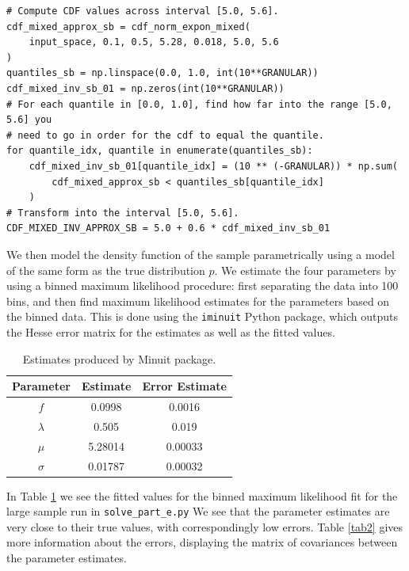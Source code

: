 \documentclass[12pt]{article}
\begin{document}
\begin{lstlisting}[caption=Code block producing array of values for inverse CDF of $p$ (e).]
# Compute CDF values across interval [5.0, 5.6].
cdf_mixed_approx_sb = cdf_norm_expon_mixed(
    input_space, 0.1, 0.5, 5.28, 0.018, 5.0, 5.6
)
quantiles_sb = np.linspace(0.0, 1.0, int(10**GRANULAR))
cdf_mixed_inv_sb_01 = np.zeros(int(10**GRANULAR))
# For each quantile in [0.0, 1.0], find how far into the range [5.0, 5.6] you
# need to go in order for the cdf to equal the quantile.
for quantile_idx, quantile in enumerate(quantiles_sb):
    cdf_mixed_inv_sb_01[quantile_idx] = (10 ** (-GRANULAR)) * np.sum(
        cdf_mixed_approx_sb < quantiles_sb[quantile_idx]
    )
# Transform into the interval [5.0, 5.6].
CDF_MIXED_INV_APPROX_SB = 5.0 + 0.6 * cdf_mixed_inv_sb_01
\end{lstlisting}

We then model the density function of the sample parametrically using a model of the same form as the true distribution $p$.
We estimate the four parameters by using a binned maximum likelihood procedure: first separating the data into 100 bins, and then find maximum likelihood estimates for the parameters based on the binned data.
This is done using the \texttt{iminuit} Python package, which outputs the Hesse error matrix for the estimates as well as the fitted values.

\begin{table}
\centering
\begin{tabular}{| c | c | c |}
    \hline
    Parameter & Estimate & Error Estimate \\
    \hline
    $f$  & 0.0998 & 0.0016 \\
    \hline
    $\lambda$ & 0.505 & 0.019 \\
    \hline
    $\mu$ & 5.28014 & 0.00033 \\
    \hline
    $\sigma$ & 0.01787 & 0.00032 \\
    \hline
\end{tabular}
\caption{Estimates produced by Minuit package.}
\label{tab1}
\end{table}

In Table \ref{tab1} we see the fitted values for the binned maximum likelihood fit for the large sample run in \texttt{solve\_part\_e.py}
We see that the parameter estimates are very close to their true values, with correspondingly low errors.
Table \ref{tab2} gives more information about the errors, displaying the matrix of covariances between the parameter estimates.
\end{document}
